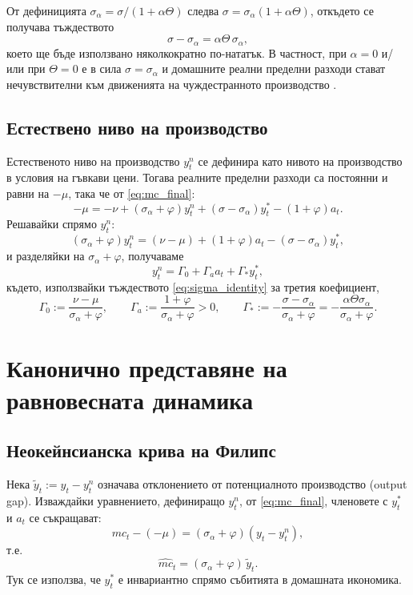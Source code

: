 От дефиницията $\sigma_\alpha = \sigma/(1+\alpha\Theta)$ следва $\sigma = \sigma_\alpha(1+\alpha\Theta)$, откъдето се получава тъждеството
\begin{equation}
\sigma - \sigma_\alpha = \alpha\Theta\,\sigma_\alpha,
\label{eq:sigma_identity}
\end{equation}
което ще бъде използвано няколкократно по-нататък. В частност, при $\alpha = 0$ и/или при $\Theta = 0$ е в сила $\sigma = \sigma_\alpha$ и домашните реални пределни разходи стават нечувствителни към движенията на чуждестранното производство \parencite[с.~164]{Gali2008}.

\subsection{Естествено ниво на производство}

Естественото ниво на производство $y^n_t$ се дефинира като нивото на производство в условия на гъвкави цени. Тогава реалните пределни разходи са постоянни и равни на $-\mu$, така че от \eqref{eq:mc_final}:
\[
-\mu = -\nu + (\sigma_\alpha + \varphi) y^n_t + (\sigma - \sigma_\alpha) y^*_t - (1+\varphi) a_t.
\]
Решавайки спрямо $y^n_t$:
\[
(\sigma_\alpha + \varphi) y^n_t = (\nu - \mu) + (1+\varphi)a_t - (\sigma - \sigma_\alpha) y^*_t,
\]
и разделяйки на $\sigma_\alpha + \varphi$, получаваме
\begin{equation}
y^n_t = \Gamma_0 + \Gamma_a a_t + \Gamma_* y^*_t,
\label{eq:natural_output}
\end{equation}
където, използвайки тъждеството \eqref{eq:sigma_identity} за третия коефициент,
\begin{equation}
\Gamma_0 := \frac{\nu - \mu}{\sigma_\alpha + \varphi},
\qquad
\Gamma_a := \frac{1+\varphi}{\sigma_\alpha + \varphi} > 0,
\qquad
\Gamma_* := -\frac{\sigma - \sigma_\alpha}{\sigma_\alpha + \varphi} = -\frac{\alpha\Theta\sigma_\alpha}{\sigma_\alpha + \varphi}.
\label{eq:Gamma_coefs}
\end{equation}

\section{Канонично представяне на равновесната динамика}

\subsection{Неокейнсианска крива на Филипс}

Нека $\tilde{y}_t := y_t - y^n_t$ означава отклонението от потенциалното производство (output gap). Изваждайки уравнението, дефиниращо $y^n_t$, от \eqref{eq:mc_final}, членовете с $y^*_t$ и $a_t$ се съкращават:
\[
mc_t - (-\mu) = (\sigma_\alpha + \varphi)(y_t - y^n_t),
\]
т.е.
\begin{equation}
\widehat{mc}_t = (\sigma_\alpha + \varphi)\, \tilde{y}_t.
\label{eq:mc_gap}
\end{equation}
Тук се използва, че $y^*_t$ е инвариантно спрямо събитията в домашната икономика.

